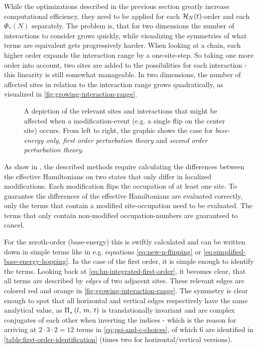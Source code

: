 While the optimizations described in the previous section greatly increase computational efficiency, they need to be applied for each $\mathcal{H}_{N}(t)$-order and each $\Phi_\ast(N)$ separately.
The problem is, that for two dimensions the number of interactions to consider grows quickly, while visualizing the symmetries of what terms are equivalent gets progressively harder.
When looking at a chain, each higher order expands the interaction range by a one-site-step. 
So taking one more order into account, two sites are added to the possibilities for each interaction - this linearity is still somewhat manageable.
In two dimensions, the number of affected sites in relation to the interaction range grows quadratically, as visualized in \autoref{fig:growing-interaction-range}.

\begin{figure}[htbp]
    \centering
    
    \caption{
        A depiction of the relevant sites and interactions that might be affected when a modification-event (e.g. a single flip on the center site) occurs.
        From left to right, the graphic shows the case for \emph{base-energy only}, \emph{first order perturbation theory} and \emph{second order perturbation theory}.
    }
    \label{fig:growing-interaction-range}
\end{figure}

As show in , the described methods require calculating the differences between the effective Hamiltonians on two states that only differ in localized modifications.
Each modification flips the occupation of at least one site. 
To guarantee the differences of the effective Hamiltonians are evaluated correctly, only the terms that contain a modified site-occupation need to be evaluated. 
The terms that only contain non-modified occupation-numbers are guaranteed to cancel.

For the zeroth-order (base-energy) this is swiftly calculated and can be written down in simple terms like in e.g. equations \ref{eq:new-n-flipping} or \ref{eq:simplified-base-energy-hopping}.
In the case of the first order, it is simple enough to identify the terms.
Looking back at \autoref{eq:hn-integrated-first-order}, it becomes clear, that all terms are described by \emph{edges} of two adjacent sites.
These relevant edges are colored red and orange in \autoref{fig:growing-interaction-range}. 
The symmetry is clear enough to spot that all horizontal and vertical edges respectively have the same analytical value, as $\Pi^{}_\text{$\ast$}\left(l,\,m,\,t\right)$ is translationally invariant and are complex conjugates of each other when inverting the indices - which is the reason for arriving at $2\cdot 3 \cdot 2 = 12$ terms in \autoref{eq:psi-and-c-choices}, of which 6 are identified in \autoref{table:first-order-identification} (times two for horizontal/vertical versions).

